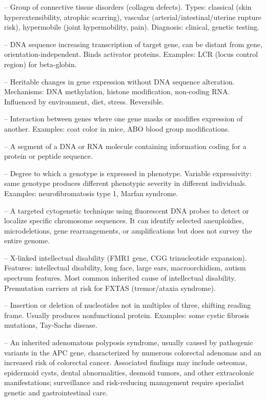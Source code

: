 -- Group of connective tissue disorders (collagen defects). Types: classical (skin hyperextensibility, atrophic scarring), vascular (arterial/intestinal/uterine rupture risk), hypermobile (joint hypermobility, pain). Diagnosis: clinical, genetic testing.

-- DNA sequence increasing transcription of target gene, can be distant from gene, orientation-independent. Binds activator proteins. Examples: LCR (locus control region) for beta-globin.

-- Heritable changes in gene expression without DNA sequence alteration. Mechanisms: DNA methylation, histone modification, non-coding RNA. Influenced by environment, diet, stress. Reversible.

-- Interaction between genes where one gene masks or modifies expression of another. Examples: coat color in mice, ABO blood group modifications.

-- A segment of a DNA or RNA molecule containing information coding for a protein or peptide sequence.

-- Degree to which a genotype is expressed in phenotype. Variable expressivity: same genotype produces different phenotypic severity in different individuals. Examples: neurofibromatosis type 1, Marfan syndrome.

-- A targeted cytogenetic technique using fluorescent DNA probes to detect or localize specific chromosome sequences. It can identify selected aneuploidies, microdeletions, gene rearrangements, or amplifications but does not survey the entire genome.

-- X-linked intellectual disability (FMR1 gene, CGG trinucleotide expansion). Features: intellectual disability, long face, large ears, macroorchidism, autism spectrum features. Most common inherited cause of intellectual disability. Premutation carriers at risk for FXTAS (tremor/ataxia syndrome).

-- Insertion or deletion of nucleotides not in multiples of three, shifting reading frame. Usually produces nonfunctional protein. Examples: some cystic fibrosis mutations, Tay-Sachs disease.

-- An inherited adenomatous polyposis syndrome, usually caused by pathogenic variants in the APC gene, characterized by numerous colorectal adenomas and an increased risk of colorectal cancer. Associated findings may include osteomas, epidermoid cysts, dental abnormalities, desmoid tumors, and other extracolonic manifestations; surveillance and risk-reducing management require specialist genetic and gastrointestinal care.

